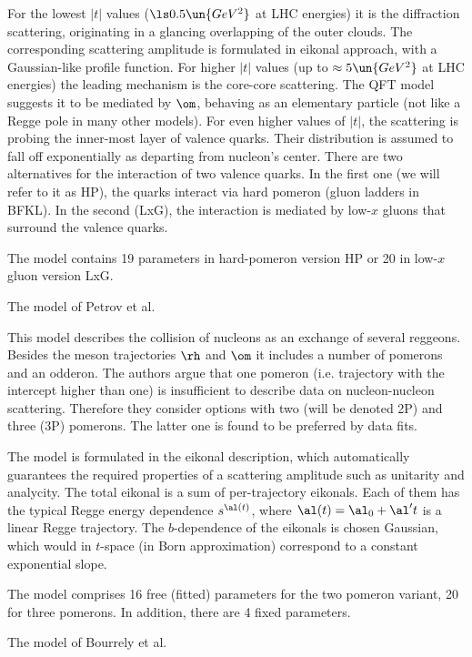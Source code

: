 For the lowest $|t|$ values ($\ls 0.5\un{GeV^2}$ at LHC energies) it is the diffraction scattering, originating in a glancing overlapping of the outer clouds. The corresponding scattering amplitude is formulated in eikonal approach, with a Gaussian-like profile function. For higher $|t|$ values (up to $\approx 5\un{GeV^2}$ at LHC energies) the leading mechanism is the core-core scattering. The QFT model suggests it to be mediated by $\rm\om$, behaving as an elementary particle (not like a Regge pole in many other models). For even higher values of $|t|$, the scattering is probing the inner-most layer of valence quarks. Their distribution is assumed to fall off exponentially as departing from nucleon's center. There are two alternatives for the interaction of two valence quarks. In the first one (we will refer to it as HP), the quarks interact via hard pomeron (gluon ladders in BFKL). In the second (LxG), the interaction is mediated by low-$x$ gluons that surround the valence quarks.

The model contains 19 parameters in hard-pomeron version HP or 20 in low-$x$ gluon version LxG.

\caption{The model of Petrov et al. }

This model describes the collision of nucleons as an exchange of several reggeons. Besides the meson trajectories $\rm\rh$ and $\rm\om$ it includes a number of pomerons and an odderon. The authors argue that one pomeron (i.e. trajectory with the intercept higher than one) is insufficient to describe data on nucleon-nucleon scattering. Therefore they consider options with two (will be denoted 2P) and three (3P) pomerons. The latter one is found to be preferred by data fits.

The model is formulated in the eikonal description, which automatically guarantees the required properties of a scattering amplitude such as unitarity and analycity. The total eikonal is a sum of per-trajectory eikonals. Each of them has the typical Regge energy dependence $s^{\al(t)}$, where $\al(t) = \al_0 + \al' t$ is a linear Regge trajectory. The $b$-dependence of the eikonals is chosen Gaussian, which would in $t$-space (in Born approximation) correspond to a constant exponential slope.

The model comprises 16 free (fitted) parameters for the two pomeron variant, 20 for three pomerons. In addition, there are 4 fixed parameters.

\caption{The model of Bourrely et al. }

